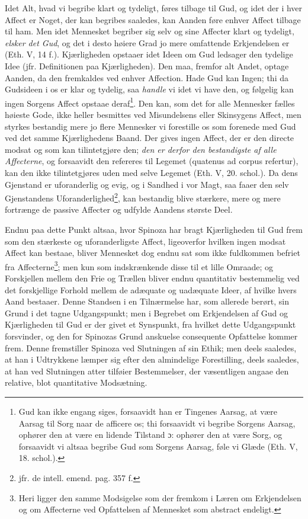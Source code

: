 \documentclass[12pt,a4paper]{book}
\newcommand{\opage}[1]{\marginnote{\footnotesize\textit{[#1]}}}
\begin{document}
Idet Alt, hvad vi begribe klart og tydeligt, føres tilbage
til Gud, og idet der i hver Affect er Noget, der kan begribes
saaledes, kan Aanden føre enhver Affect tilbage til
ham. Men idet Mennesket begriber sig selv og sine Affecter
klart og tydeligt, \emph{elsker det Gud}, og det i desto
høiere Grad jo mere omfattende Erkjendelsen er (Eth. V,
14 f.). Kjærligheden opstaaer idet Ideen om Gud ledsager
den tydelige Idee (jfr. Definitionen paa Kjærligheden). Den
maa, fremfor alt Andet, optage Aanden, da den fremkaldes
ved enhver Affection. Hade Gud kan Ingen; thi da Gudsideen
i os er klar og tydelig, saa \emph{handle} vi idet vi have
\opage{165} \setcounter{footnote}{0}%
den, og følgelig kan ingen Sorgens Affect opstaae deraf\footnote{Gud kan ikke engang siges, forsaavidt han er Tingenes Aarsag, at
være Aarsag til Sorg naar de afficere os; thi forsaavidt vi begribe
Sorgens Aarsag, ophører den at være en lidende Tilstand ɔ: ophører
den at være Sorg, og forsaavidt vi altsaa begribe Gud som Sorgens
Aarsag, føle vi Glæde (Eth. V, 18. schol.).}. Den kan, som det for
alle Mennesker fælles høieste Gode,
ikke heller besmittes ved Misundelsens eller Skinsygens Affect,
men styrkes bestandig mere jo flere Mennesker vi
forestille os som forenede med Gud ved det samme Kjærlighedens
Baand. Der gives ingen Affect, der er den directe
modsat og som kan tilintetgjøre den; \emph{den er derfor den bestandigste af alle Affecterne},
og forsaavidt den
refereres til Legemet (quatenus ad corpus refertur), kan den
ikke tilintetgjøres uden med selve Legemet (Eth. V, 20.
schol.). Da dens Gjenstand er uforanderlig og evig, og i
Sandhed i vor Magt, saa faaer den selv Gjenstandens Uforanderlighed\footnote{jfr. de intell. emend. pag. 357 f.}, kan bestandig blive stærkere, mere og mere
fortrænge de passive Affecter og udfylde Aandens største
Deel.

Endnu paa dette Punkt altsaa, hvor Spinoza har bragt
Kjærligheden til Gud frem som den stærkeste og uforanderligste
Affect, ligeoverfor hvilken ingen modsat Affect kan
bestaae, bliver Mennesket dog endnu sat som ikke fuldkommen
befriet fra Affecterne\footnote{Heri ligger den samme Modsigelse som der fremkom i Læren om
Erkjendelsen og om Affecterne ved Opfattelsen af Mennesket som
abstract endeligt.}; men kun som indskrænkende
disse til et lille Omraade; og Forskjellen mellem den Frie
og Trællen bliver endnu quantitativ bestemmelig ved det
forskjellige Forhold mellem de adæquate og uadæquate Ideer,
af hvilke hvers Aand bestaaer. Denne Standsen i en Tilnærmelse
har, som allerede berørt, sin Grund i det tagne
Udgangspunkt; men i Begrebet om Erkjendelsen af Gud og
Kjærligheden til Gud er der givet et Synspunkt, fra hvilket
dette Udgangspunkt forsvinder, og den for Spinozas Grund\-%
\opage{166}\setcounter{footnote}{0}%
anskuelse consequente Opfattelse kommer frem. Denne
fremstiller Spinoza ved Slutningen af sin Ethik; men deels
saaledes, at han i Udtrykkene læmper sig efter den almindelige
Forestilling, deels saaledes, at han ved Slutningen
atter tilføier Bestemmelser, der væsentligen angaae den relative,
blot quantitative Modsætning.
\end{document}
